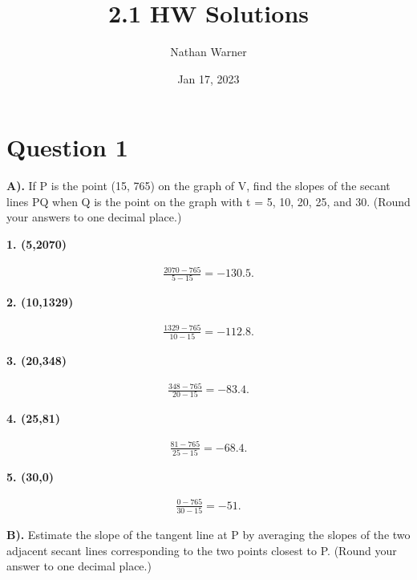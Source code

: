 \documentclass{report}
\title{\Huge{2.1 HW Solutions}}
\author{\huge{Nathan Warner}}
\date{\huge{Jan 17, 2023}}
\begin{document}
    \maketitle
    \section{\Large{Question 1}}

    \bigbreak \noindent 
    
    \bigbreak \noindent 
    \textbf{A).} If P is the point (15, 765) on the graph of V, find the slopes 
    of the secant lines PQ when Q is the point on the graph with t = 5, 10, 20, 25, and 30. 
    (Round your answers to one decimal place.)
    
    \textbf{1. (5,2070)} 

    \begin{align*}
        \frac{2070-765}{5-15} =-130.5
    .\end{align*}

    \textbf{2. (10,1329)}
    
    \begin{align*}
        \frac{1329-765}{10-15} = -112.8     
    .\end{align*}

    \textbf{3. (20,348)}

    \begin{align*}
        \frac{348-765}{20-15} = -83.4
    .\end{align*}

    \textbf{4. (25,81)}
    
    \begin{align*}
        \frac{81-765}{25-15} = -68.4
    .\end{align*}

    \textbf{5. (30,0)}
    
    \begin{align*}
        \frac{0-765}{30-15} = -51
    .\end{align*}

    \bigbreak \noindent 
    \textbf{B).} Estimate the slope of the tangent line at P by averaging the slopes of the two adjacent secant lines corresponding to the two points closest to P. (Round your answer to one decimal place.)
    
\end{document}
